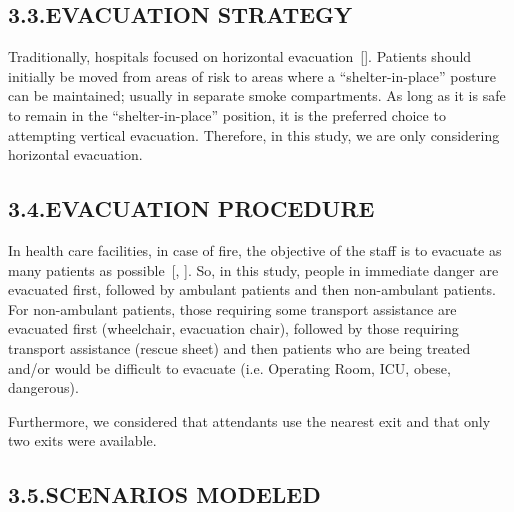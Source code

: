 \documentclass{style/llncs}
\begin{document}
\subsection{3.3.\hspace*{0.5em}EVACUATION STRATEGY}\label{sec-evacuation-strategy}%

\noindent{}Traditionally, hospitals focused on horizontal evacuation~[]. Patients
should initially be moved from areas of risk to areas where a
\textquotedblleft{}shelter-in-place\textquotedblright{} posture can be maintained; usually in
separate smoke compartments. As long as it is safe to remain in the
\textquotedblleft{}shelter-in-place\textquotedblright{} position, it is the preferred choice to
attempting vertical evacuation. Therefore, in this study, we are only
considering horizontal evacuation.%

\subsection{3.4.\hspace*{0.5em}EVACUATION PROCEDURE}\label{sec-evacuation-procedure}%

\noindent{}In health care facilities, in case of fire, the objective of the staff is
to evacuate as many patients as possible~[, ]. So, in this study,
people in immediate danger are evacuated first, followed by ambulant
patients and then non-ambulant patients. For non-ambulant patients, those
requiring some transport assistance are evacuated first (wheelchair,
evacuation chair), followed by those requiring transport assistance
(rescue sheet) and then patients who are being treated and/or would be
difficult to evacuate (i.e. Operating Room, ICU, obese, dangerous).%

Furthermore, we considered that attendants use the nearest exit and that
only two exits were available.%

\subsection{3.5.\hspace*{0.5em}SCENARIOS MODELED}\label{sec-scenarios-modeled}%
\end{document}
